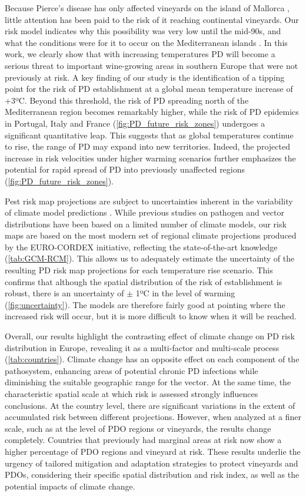 Because Pierce's disease has only affected vineyards on the island of
Mallorca \cite{moralejo2019insights}, little attention has been paid to the
risk of it reaching continental vineyards. Our risk model indicates why this
possibility was very low until the mid-90s, and what the conditions were for it
to occur on the Mediterranean islands \cite{GimenezRomero2022_CommsBio}.  In
this work,
we clearly show that  with increasing temperatures PD will become a serious
threat to important wine-growing areas in southern Europe that were not
previously at risk. A key finding of our study is the identification of a
tipping point for the risk of PD establishment at a global mean temperature
increase of +3ºC. Beyond this threshold, the risk of PD spreading north of the
Mediterranean region becomes remarkably higher, while the risk of PD epidemics
in Portugal, Italy and France (\cref{fig:PD_future_risk_zones}) undergoes a
significant quantitative leap. This suggests that as global temperatures
continue to rise, the range of PD may expand into new territories. Indeed, the
projected increase in risk velocities under higher warming scenarios further
emphasizes the potential for rapid spread of PD into previously unaffected
regions (\cref{fig:PD_future_risk_zones}).

Pest risk map projections are subject to uncertainties inherent in the
variability of climate model predictions \cite{venette2010pest}. While previous
studies on pathogen and vector distributions have been based on a limited
number of climate models, our risk maps are based on the most modern set of
regional climate projections produced by the EURO-CORDEX initiative, reflecting
the state-of-the-art knowledge (\cref{tab:GCM-RCM}). This allows us to
adequately estimate the uncertainty of the resulting PD risk map projections
for each temperature rise scenario. This confirms that although the spatial
distribution of the risk of establishment is robust, there is an uncertainty of
$\pm$ 1ºC in the level of warming (\cref{fig:uncertainty}). The models are
therefore fairly good at  pointing  where the increased risk will occur, but it
is more difficult to know when it will be reached.

Overall, our results highlight the contrasting effect of climate change on
PD risk distribution in Europe, revealing it as a multi-factor and multi-scale
process (\cref{tab:countries}). Climate change has an opposite effect on each
component of the pathosystem, enhancing areas of potential chronic PD
infections while diminishing the suitable geographic range for the vector. At
the same time, the characteristic spatial scale at which risk is assessed
strongly influences conclusions. At the country level, there are significant
variations in the extent of accumulated risk between different projections.
However, when analyzed at a finer scale, such as at the level of PDO regions or
vineyards, the results change completely. Countries that previously had
marginal areas at risk now show a higher percentage of PDO regions and vineyard
at risk. These results underlie the urgency of tailored mitigation and
adaptation strategies to protect vineyards and PDOs, considering their specific
spatial distribution and risk index, as well as the potential impacts of
climate change.

